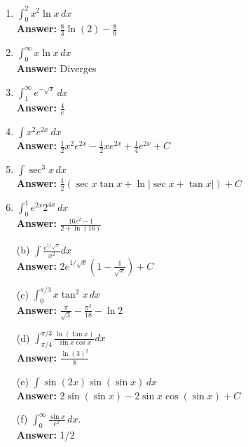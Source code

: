 \documentclass[letterpaper]{article}
\begin{document}
\begin{enumerate}
\begin{enumerate}
	\item $\int_0^2 x^2 \ln x\,dx$
	\\ \textbf{Answer:} $\frac{8}{3}\ln(2)-\frac{8}{9}$

	\item $\int_0^\infty x\ln x\,dx$
	\\ \textbf{Answer:} Diverges

	\item $\int_1^\infty e^{-\sqrt x}\,dx$
	\\ \textbf{Answer:} $\frac{4}{e}$

	\item $\int x^2 e^{2x}~dx$
	\\ \textbf{Answer:} $\frac12 x^2 e^{2x}- \frac12xe^{2x}+\frac14e^{2x}+C$

	\item $\int \sec^3 x\,dx$
	\\ \textbf{Answer:} $\frac{1}{2}\left(\sec x \tan x + \ln | \sec x + \tan x| \right)+C$

	\item $\int_0^1 e^{2x}2^{4x}\,dx$
	\\ \textbf{Answer:} $\frac{16e^2-1}{2+\ln(16)}$

	\item[(b)] $\int \frac{e^{1/\sqrt{x}}}{x^2}dx$
	\\ \textbf{Answer:} $2e^{1/\sqrt{x}}\left(1-\frac{1}{\sqrt x}\right)+C$

	\item[(c)] $\int_0^{\pi/3} x\tan^2 x\,dx$
	\\ \textbf{Answer:} $\frac{\pi}{\sqrt{3}}-\frac{\pi^2}{18}-\ln 2$

	\item[(d)] $\int_{\pi/4}^{\pi/3} \frac{\ln(\tan x)}{\sin x \cos x}dx$
	\\ \textbf{Answer:} $\frac{\ln(3)^2}{8}$

	\item[(e)] $\int \sin(2x)\sin(\sin x)\,dx$
	\\ \textbf{Answer:} $2\sin(\sin x)-2\sin x\cos(\sin x)+C$

	\item[(f)] $\int_0^\infty \frac{\sin x}{e^x}\,dx$.
	\\ \textbf{Answer:} 1/2
	\end{enumerate}


\end{enumerate}
\end{document}
